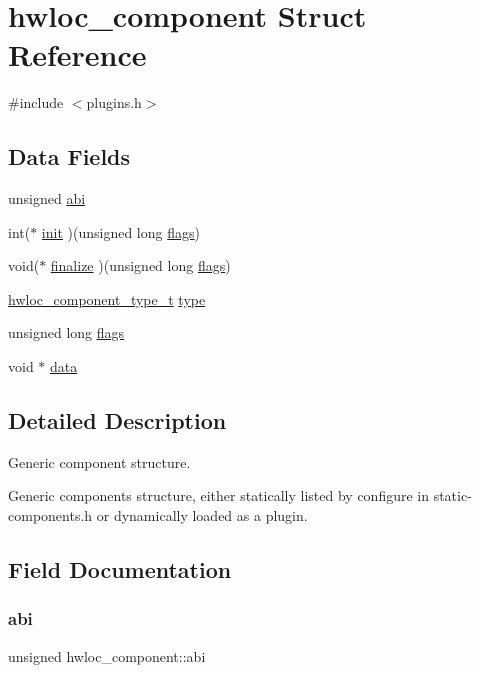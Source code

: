 \hypertarget{a00378}{}\section{hwloc\+\_\+component Struct Reference}
\label{a00378}


{\ttfamily \#include $<$plugins.\+h$>$}

\subsection*{Data Fields}
\begin{DoxyCompactItemize}
\item 
unsigned \hyperlink{a00378_a3250bd6fc9713946991d805e48091b2e}{abi}
\item 
int($\ast$ \hyperlink{a00378_aea613546886d9b8221cadba920fe3ebc}{init} )(unsigned long \hyperlink{a00378_ab8043c5b4cc0e81aabba586ccb194335}{flags})
\item 
void($\ast$ \hyperlink{a00378_a4612015451a1c706e8ba19114cb8baae}{finalize} )(unsigned long \hyperlink{a00378_ab8043c5b4cc0e81aabba586ccb194335}{flags})
\item 
\hyperlink{a00229_ga0aebfa65317af10bb18d7d35f6dc05b8}{hwloc\+\_\+component\+\_\+type\+\_\+t} \hyperlink{a00378_a789208ada7e17492cfd3a5a88a6bb0ee}{type}
\item 
unsigned long \hyperlink{a00378_ab8043c5b4cc0e81aabba586ccb194335}{flags}
\item 
void $\ast$ \hyperlink{a00378_a4b8cffd1d943c29fdc102b841b8598d4}{data}
\end{DoxyCompactItemize}


\subsection{Detailed Description}
Generic component structure. 

Generic components structure, either statically listed by configure in static-\/components.\+h or dynamically loaded as a plugin. 

\subsection{Field Documentation}
\mbox{\label{a00378_a3250bd6fc9713946991d805e48091b2e}} 
\subsubsection{\texorpdfstring{abi}{abi}}
{\footnotesize\ttfamily unsigned hwloc\+\_\+component\+::abi}



